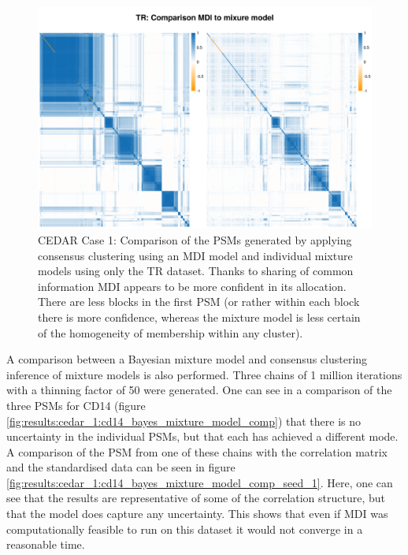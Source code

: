 \documentclass[14pt]{extarticle} %
\begin{document}
	\begin{figure} %
		\centering
		\includegraphics[scale=0.75]{Images/Biology_data/Set_250/Comparison_mdi_mixture_model/TR_comparison_all_specific_sim.png}
		\caption{CEDAR Case 1: Comparison of the PSMs generated by applying consensus clustering using an MDI model and individual mixture models using only the TR dataset. Thanks to sharing of common information MDI appears to be more confident in its allocation. There are less blocks in the first PSM (or rather within each block there is more confidence, whereas the mixture model is less certain of the homogeneity of membership within any cluster).}
		\label{fig:results:cedar_1:mdi_mixture_model_comp_tr}
	\end{figure}
	
	A comparison between a Bayesian mixture model and consensus clustering inference of mixture models is also performed. Three chains of 1 million iterations with a thinning factor of 50 were generated. One can see in a comparison of the three PSMs for CD14 (figure \ref{fig:results:cedar_1:cd14_bayes_mixture_model_comp}) that there is no uncertainty in the individual PSMs, but that each has achieved a different mode. A comparison of the PSM from one of these chains with the correlation matrix and the standardised data can be seen in figure \ref{fig:results:cedar_1:cd14_bayes_mixture_model_comp_seed_1}. Here, one can see that the results are representative of some of the correlation structure, but that the model does capture any uncertainty. This shows that even if MDI was computationally feasible to run on this dataset it would not converge in a reasonable time.
	
\end{document}
